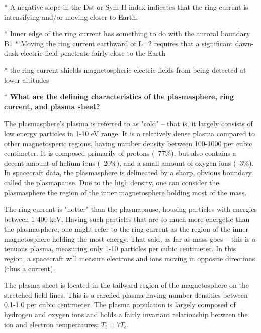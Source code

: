 * A negative slope in the Dst or Sym-H index indicates that the ring current is
intensifying and/or moving closer to Earth.

* Inner edge of the ring current has something to do with the auroral boundary
B1
* Moving the ring current earthward of L=2 requires that a significant
dawn-dusk electric field penetrate fairly close to the Earth

* the ring current shields magnetospheric electric fields from being detected
at lower altitudes


*
\textbf{ What are the defining characteristics of the plasmasphere, ring
current, and plasma sheet?}

The plasmasphere's plasma is referred to as "cold" -- that is, it
largely consists of low energy particles in 1-10 eV range. It is a
relatively dense plasma compared to other magnetosperic regions, having
number density between 100-1000 per cubic centimeter. It is composed
primarily of protons (~77\%), but also contains a decent amount of
helium ions (~20\%), and a small amount of oxygen ions (~3\%). In
spacecraft data, the plasmasphere is delineated by a sharp, obvious
boundary called the plasmapause. Due to the high density, one can
consider the plasmasphere the region of the inner magnetosphere
holding most of the mass.

The ring current is "hotter" than the plasmapause, housing particles
with energies between 1-400 keV. Having such particles that are so much
more energetic than the plasmasphere, one might refer to the ring
current as the region of the inner magnetosphere holding the most
energy. That said, as far as mass goes -- this is a tenuous plasma,
measuring only 1-10 particles per cubic centimeter. In this region, a
spacecraft will measure electrons and ions moving in opposite directions
(thus a current). 

The plasma sheet is located in the tailward region of the magnetosphere
on the stretched field lines. This is a rarefied plasma having number
densities between 0.1-1.0 per cubic centimeter. The plasma population is
largely composed of hydrogen and oxygen ions and holds a fairly
invariant relationship between the ion and electron temperatures: $T_{i}
= 7T_{e}$.


